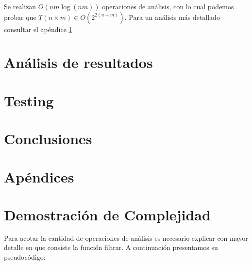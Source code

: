 \documentclass[a4paper, 12pt] {article}
\begin{document}
Se realizan $O\left( nm \log\left(  nm \right) \right) $ operaciones de an\'alisis, con lo cual podemos probar que $T\left( n \times m\right) \in O(2^{2\left( n+m\right) })$. Para un an\'alisis m\'as detallado consultar el ap\'endice \ref{demo:comp_3}



\section*{An\'alisis de resultados}

\section*{Testing}

\begin{comment}
\begin{center}
\includegraphicx[width=0.7\textwidth]{Plots/Ej1-Complejidad.png}
\begin{center}
FiguraX
\end{center}
\end{center}
\end{comment}
\section*{Conclusiones}
\section*{Ap\'endices} 
\section{Demostraci\'on de Complejidad}\label{demo:comp_3}

Para acotar la cantidad de operaciones de an\'alisis es necesario explicar con mayor detalle en que consiste la funci\'on filtrar.
A continuaci\'on presentamos su pseudoc\'odigo:
\end{document}
